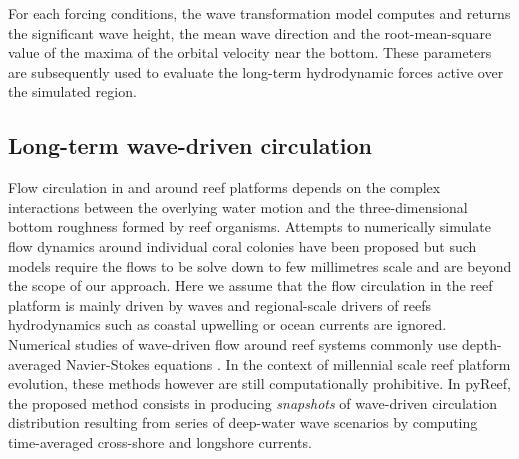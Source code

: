 \documentclass[default,jgrga]{agutex2015}
\begin{document}
\begin{article}
\noindent For each forcing conditions, the wave transformation model computes and returns the significant wave height, the mean wave direction and the root-mean-square value of the maxima of the orbital velocity near the bottom. These parameters are subsequently used to evaluate the long-term hydrodynamic forces active over the simulated region.

\subsection{Long-term wave-driven circulation}

Flow circulation in and around reef platforms depends on the complex interactions between the overlying water motion and the three-dimensional bottom roughness formed by reef organisms. Attempts to numerically simulate flow dynamics around individual coral colonies have been proposed \citep{Kaandorp03, Chang09, Chindapol13} but such models require the flows to be solve down to few millimetres scale and are beyond the scope of our approach. Here we assume that the flow circulation in the reef platform is mainly driven by waves and regional-scale drivers of reefs hydrodynamics such as coastal upwelling or ocean currents are ignored. Numerical studies of wave-driven flow around reef systems commonly use depth-averaged Navier-Stokes equations \citep{Raupach82, Symonds95, Lowe05, Lowe09, Pomeroy12, Taebi11}. In the context of millennial scale reef platform evolution, these methods however are still computationally prohibitive. In pyReef, the proposed method consists in producing \textit{snapshots} of wave-driven circulation distribution resulting from series of deep-water wave scenarios by computing time-averaged cross-shore and longshore currents.


\end{article}
\end{document}
